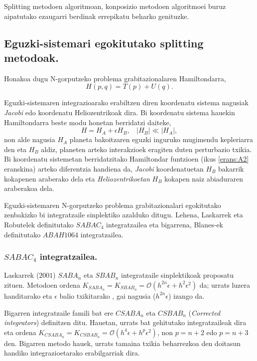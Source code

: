 Splitting metodoen algoritmoan, konposizio metodoen algoritmoei buruz aipatutako ezaugarri berdinak errepikatu beharko genituzke. 

\subsection{Eguzki-sistemari egokitutako splitting metodoak.}

Honakoa dugu N-gorputzeko problema grabitazionalaren Hamiltondarra,
\begin{equation*}
H(p,q)=T(p)+U(q).
\end{equation*}

Eguzki-sistemaren integrazioarako erabiltzen diren koordenatu sistema nagusiak \emph{Jacobi} edo koordenatu Heliozentrikoak dira.  Bi koordenatu sistema hauekin Hamiltondarra beste modu honetan berridatzi daiteke,
\begin{equation*}
H=H_A+\epsilon H_B,  \ \ \ \ |H_B|\ll|H_A|,
\end{equation*}
non alde nagusia $H_A$ planeta bakoitzaren eguzki inguruko mugimendu kepleriarra den eta $H_B$ aldiz, planeten arteko interakzioek eragiten duten perturbazio txikia. Bi koordenatu sistemetan berridatzitako Hamiltondar funtzioen (ikus \ref{erans:A2} eranskina) arteko diferentzia handiena da, \emph{Jacobi} koordenatuetan $H_B$ bakarrik kokapenen araberako dela eta \emph{Heliozentrikoetan} $H_B$ kokapen naiz abiaduraren araberakoa dela.       

Eguzki-sistemaren N-gorputzeko problema grabitazionalari egokitutako zenbakizko bi integratzaile sinplektiko azalduko ditugu. Lehena, Laskarrek eta Robutelek \cite[~2001]{Laskar2001} definitutako \emph{$SABAC_4$} integratzailea eta bigarrena, Blanes-ek \cite[~2013]{Blanes2013} \cite{Farres2013} definitutako \emph{$ABAH1064$} integratzailea. 


\subsubsection*{$SABAC_4$ integratzailea.}

Laskarrek ($2001$) $SABA_n$ eta $SBAB_n$ integratzaile sinplektikoak \cite{Laskar2001} proposatu zituen. Metodoen ordena $K_{SABA_n}=K_{SBAB_n}=\mathcal{O}(h^{2n} \epsilon+ h^2 \epsilon^2)$ da; urrats luzera handitarako eta $\epsilon$ balio txikitarako , gai nagusia ($h^{2n} \epsilon$) izango da.

Bigarren integratzaile famili bat ere $CSABA_n$ eta $CSBAB_n$ (\emph{Corrected integrators}) definitzen ditu. Hauetan, urrats bat gehitutako integratzaileak dira eta ordena $K_{CSABA_n}=K_{CSBAB_n}=\mathcal{O}(h^{4} \epsilon+ h^{p} \epsilon^2)$, non $p=n+2$ edo $p=n+3$ den. Bigarren metodo hauek, urrats tamaina txikia beharrezkoa den  doitasun handiko integrazioetarako erabilgarriak dira.

